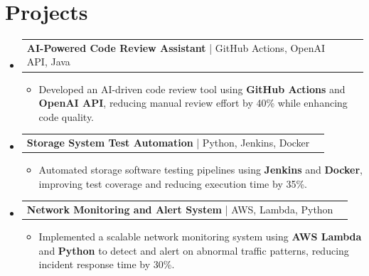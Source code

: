 \documentclass[letterpaper,11pt]{article}
\makeatletter
\newcommand{\resumeItem}[1]{
  \item\footnotesize{
    {#1 \vspace{-2pt}}
  }
}
\newcommand{\resumeProjectHeading}[2]{
    \item
    \begin{tabular*}{1.001\textwidth}{l@{\extracolsep{\fill}}r}
      \small#1 & \textbf{\small #2}\\
    \end{tabular*}\vspace{-7pt}
}
\newcommand{\resumeSubHeadingListStart}{\begin{itemize}[leftmargin=0pt, label={}]}
\newcommand{\resumeSubHeadingListEnd}{\end{itemize}}
\newcommand{\resumeItemListStart}{\begin{itemize}[leftmargin=*]}
\newcommand{\resumeItemListEnd}{\end{itemize}\vspace{-5pt}}
\makeatother
\begin{document}
\section{Projects}
    \vspace{-5pt}
    \resumeSubHeadingListStart
      \resumeProjectHeading
          {\textbf{AI-Powered Code Review Assistant} | GitHub Actions, OpenAI API, Java}{}
          \resumeItemListStart
              \resumeItem{Developed an AI-driven code review tool using \textbf{GitHub Actions} and \textbf{OpenAI API}, reducing manual review effort by 40\% while enhancing code quality.}
          \resumeItemListEnd
          \vspace{-12pt}
      \resumeProjectHeading
          {\textbf{Storage System Test Automation} | Python, Jenkins, Docker}{}
          \resumeItemListStart
              \resumeItem{Automated storage software testing pipelines using \textbf{Jenkins} and \textbf{Docker}, improving test coverage and reducing execution time by 35\%.}
          \resumeItemListEnd
          \vspace{-12pt}
      \resumeProjectHeading
          {\textbf{Network Monitoring and Alert System} | AWS, Lambda, Python}{}
          \resumeItemListStart
              \resumeItem{Implemented a scalable network monitoring system using \textbf{AWS Lambda} and \textbf{Python} to detect and alert on abnormal traffic patterns, reducing incident response time by 30\%.}
          \resumeItemListEnd 
    \resumeSubHeadingListEnd
\end{document}
